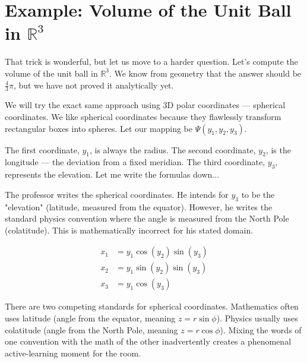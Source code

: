 \section{Example: Volume of the Unit Ball in \texorpdfstring{$\mathbb{R}^3$}{R3}}

\begin{spoken-clean}[00:26:33 - 00:32:00]
That trick is wonderful, but let us move to a harder question. Let's compute the volume of the unit ball in $\mathbb{R}^3$. We know from geometry that the answer should be $\frac{4}{3}\pi$, but we have not proved it analytically yet.

We will try the exact same approach using 3D polar coordinates — spherical coordinates. We like spherical coordinates because they flawlessly transform rectangular boxes into spheres. Let our mapping be $\Psi(y_1, y_2, y_3)$. 

The first coordinate, $y_1$, is always the radius. The second coordinate, $y_2$, is the longitude — the deviation from a fixed meridian. The third coordinate, $y_3$, represents the elevation. Let me write the formulas down...
\end{spoken-clean}

\begin{nice-box}
The professor writes the spherical coordinates. He intends for $y_3$ to be the "elevation" (latitude, measured from the equator). However, he writes the standard physics convention where the angle is measured from the North Pole (colatitude). This is mathematically incorrect for his stated domain.
\end{nice-box}

\begin{math-stroke}
\begin{align} 
x_1 &= y_1 \cos(y_2) \sin(y_3) \nonumber \\
x_2 &= y_1 \sin(y_2) \sin(y_3) \label{eq:wrong_spherical} \\
x_3 &= y_1 \cos(y_3) \nonumber
\end{align}
\end{math-stroke}

\begin{didactic-insight}
There are two competing standards for spherical coordinates. Mathematics often uses latitude (angle from the equator, meaning $z = r\sin\phi$). Physics usually uses colatitude (angle from the North Pole, meaning $z = r\cos\phi$). Mixing the words of one convention with the math of the other inadvertently creates a phenomenal active-learning moment for the room.
\end{didactic-insight}

